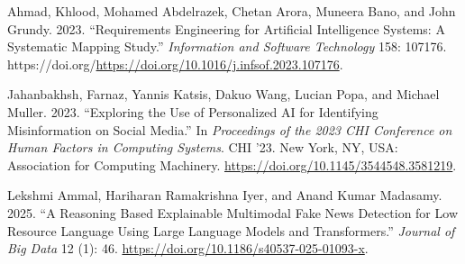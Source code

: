 \documentclass[
  12pt,
  a4paper,
]{article}
\newlength{\cslhangindent}
\newenvironment{CSLReferences}[2] %
 {\begin{list}{}{%
  \setlength{\itemindent}{0pt}
  \setlength{\leftmargin}{0pt}
  \setlength{\parsep}{0pt}
  \ifodd #1
   \setlength{\leftmargin}{\cslhangindent}
   \setlength{\itemindent}{-1\cslhangindent}
  \fi
  \setlength{\itemsep}{#2\baselineskip}}}
 {\end{list}}
\begin{document}
\label{refs}
\begin{CSLReferences}{1}{0}
Ahmad, Khlood, Mohamed Abdelrazek, Chetan Arora, Muneera Bano, and John
Grundy. 2023. {``Requirements Engineering for Artificial Intelligence
Systems: A Systematic Mapping Study.''} \emph{Information and Software
Technology} 158: 107176.
https://doi.org/\url{https://doi.org/10.1016/j.infsof.2023.107176}.

Jahanbakhsh, Farnaz, Yannis Katsis, Dakuo Wang, Lucian Popa, and Michael
Muller. 2023. {``Exploring the Use of Personalized AI for Identifying
Misinformation on Social Media.''} In \emph{Proceedings of the 2023 CHI
Conference on Human Factors in Computing Systems}. CHI '23. New York,
NY, USA: Association for Computing Machinery.
\url{https://doi.org/10.1145/3544548.3581219}.

Lekshmi Ammal, Hariharan Ramakrishna Iyer, and Anand Kumar Madasamy.
2025. {``A Reasoning Based Explainable Multimodal Fake News Detection
for Low Resource Language Using Large Language Models and
Transformers.''} \emph{Journal of Big Data} 12 (1): 46.
\url{https://doi.org/10.1186/s40537-025-01093-x}.

\end{CSLReferences}
\end{document}
